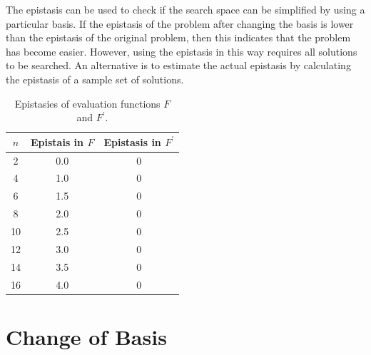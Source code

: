 The epistasis can be used to check if the search space can be simplified by using a particular basis. If the epistasis of the problem after changing the basis is lower than the epistasis of the original problem, then this indicates that the problem has become easier. However, using the epistasis in this way requires all solutions to be searched. An alternative is to estimate the actual epistasis by calculating the epistasis of a sample set of solutions.

\begin{table}
	\caption{Epistasies of evaluation functions $ F $ and $ F^\prime $.} \label{tab:epi_func}
	\vspace*{0.2cm}
	\centering
	\begin{tabular}{ccc}
		\toprule
		$ n $ & Epistais in $ F $ & Epistasis in $ F^\prime $   \\ 
		\midrule
		2 &  0.0 & 0   \\
		4 &  1.0 &  0  \\
		6 &  1.5 & 0  \\
		8 &  2.0 & 0  \\
		10&  2.5 & 0  \\
		12&  3.0 & 0  \\
		14&  3.5 & 0  \\
		16&  4.0 & 0\\
		\bottomrule
	\end{tabular}
\end{table}

\section{Change of Basis} \label{sec3:cob}
